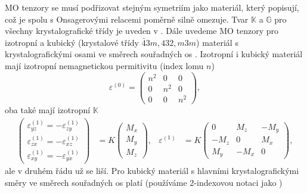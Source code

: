 MO tenzory se musí podřizovat stejným symetriím jako materiál, který popisují, což je spolu s Onsagerovými relacemi poměrně silně omezuje.
Tvar $\mathbb{K}$ a $\mathbb{G}$ pro všechny krystalografické třídy je uveden v \cite{visnovskyOpticsMagneticMultilayers2018}.
Dále uvedeme MO tenzory pro izotropní a kubický (krystalové třídy $\bar{4}3m, 432, m3m$) materiál s krystalografickými osami ve směrech souřadných os \cite{hamrlovaQuadraticinmagnetizationPermittivityConductivity2013,visnovskyOpticsMagneticMultilayers2018}.
Izotropní i kubický materiál mají izotropní nemagnetickou permitivitu (index lomu $n$)
\begin{equation}
    \varepsilon^{(0)}=\begin{pmatrix}
        n^2 & 0 & 0 \\ 0 & n^2 & 0 \\ 0 & 0 & n^2
    \end{pmatrix} ,
\end{equation}
oba také mají izotropní $\mathbb{K}$
\begin{align}
    \label{eqn:permitivita-kub-K}
    \begin{pmatrix} \varepsilon^{(1)}_{yz} =-\varepsilon^{(1)}_{zy} \\ \varepsilon^{(1)}_{zx}=-\varepsilon^{(1)}_{xz} 
        \\ \varepsilon^{(1)}_{xy}=-\varepsilon^{(1)}_{yx}\end{pmatrix}
    &= K
    \begin{pmatrix}M_x \\ M_y \\ M_z\end{pmatrix} 
    , & \varepsilon^{(1)} &= K 
    \begin{pmatrix} 0 & M_z & -M_y \\ -M_z & 0 & M_x \\ M_y & -M_x & 0 \end{pmatrix} ,
\end{align}
ale v druhém řádu už se liší.
Pro kubický materiál s hlavními krystalografickými směry ve směrech souřadných os platí (používáme 2-indexovou notaci jako \cite{hamrlovaQuadraticinmagnetizationPermittivityConductivity2013})
